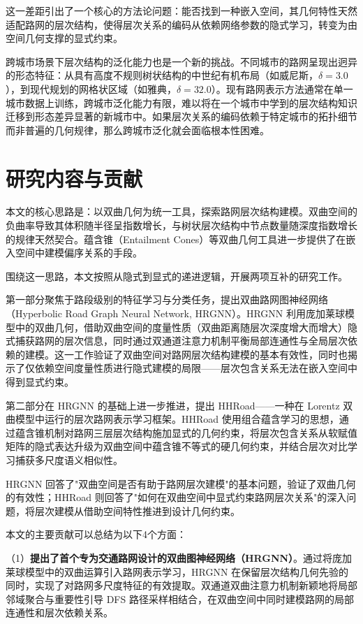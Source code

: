 这一差距引出了一个核心的方法论问题：能否找到一种嵌入空间，其几何特性天然适配路网的层次结构，使得层次关系的编码从依赖网络参数的隐式学习，转变为由空间几何支撑的显式约束。

跨城市场景下层次结构的泛化能力也是一个新的挑战。不同城市的路网呈现出迥异的形态特征：从具有高度不规则树状结构的中世纪有机布局（如威尼斯，$\delta=3.0$），到现代规划的网格状区域（如雅典，$\delta=32.0$）。现有路网表示方法通常在单一城市数据上训练，跨城市泛化能力有限，难以将在一个城市中学到的层次结构知识迁移到形态差异显著的新城市中。如果层次关系的编码依赖于特定城市的拓扑细节而非普遍的几何规律，那么跨城市泛化就会面临根本性困难。

\section{研究内容与贡献}


本文的核心思路是：以双曲几何为统一工具，探索路网层次结构建模。双曲空间的负曲率导致其体积随半径呈指数增长，与树状层次结构中节点数量随深度指数增长的规律天然契合。蕴含锥（Entailment Cones）\cite{ganea2018entailment}等双曲几何工具进一步提供了在嵌入空间中建模偏序关系的手段。

围绕这一思路，本文按照从隐式到显式的递进逻辑，开展两项互补的研究工作。

第一部分聚焦于路段级别的特征学习与分类任务，提出双曲路网图神经网络（Hyperbolic Road Graph Neural Network, HRGNN）。HRGNN 利用庞加莱球模型中的双曲几何，借助双曲空间的度量性质（双曲距离随层次深度增大而增大）隐式捕获路网的层次信息，同时通过双通道注意力机制平衡局部连通性与全局层次依赖的建模。这一工作验证了双曲空间对路网层次结构建模的基本有效性，同时也揭示了仅依赖空间度量性质进行隐式建模的局限——层次包含关系无法在嵌入空间中得到显式约束。

第二部分在 HRGNN 的基础上进一步推进，提出 HHRoad——一种在 Lorentz 双曲模型中运行的层次路网表示学习框架。HHRoad 使用组合蕴含学习的思想，通过蕴含锥机制对路网三层层次结构施加显式的几何约束，将层次包含关系从软赋值矩阵的隐式表达升级为双曲空间中蕴含锥不等式的硬几何约束，并结合层次对比学习捕获多尺度语义相似性。

HRGNN 回答了"双曲空间是否有助于路网层次建模"的基本问题，验证了双曲几何的有效性；HHRoad 则回答了"如何在双曲空间中显式约束路网层次关系"的深入问题，将层次建模从借助空间特性推进到设计几何约束。

本文的主要贡献可以总结为以下4个方面：

（1）\textbf{提出了首个专为交通路网设计的双曲图神经网络（HRGNN）}。通过将庞加莱球模型中的双曲运算引入路网表示学习，HRGNN 在保留层次结构几何先验的同时，实现了对路网多尺度特征的有效提取。双通道双曲注意力机制新颖地将局部邻域聚合与重要性引导 DFS 路径采样相结合，在双曲空间中同时建模路网的局部连通性和层次依赖关系。

